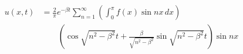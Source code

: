 \documentclass{article}
\begin{document}
\begin{align*}
  u(x, t) & = \frac{2}{\pi} e^{-\beta t} \sum_{n = 1}^\infty \left( \int_0^\pi f(x) \sin n x \,d x \right)                              \\
          & \qquad \left( \cos \sqrt{n^2 - \beta^2} t + \frac{\beta}{\sqrt{n^2 - \beta^2}} \sin \sqrt{n^2 - \beta^2} t \right) \sin n x
\end{align*}
\end{document}
